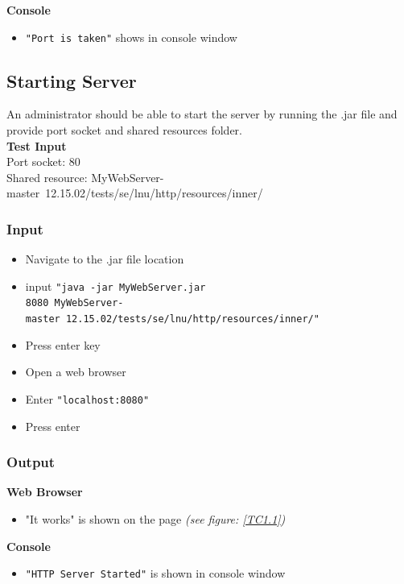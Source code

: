 \documentclass[a4paper, 12pt]{article}
\begin{document}
\textbf{Console}
\begin{itemize}
\item \texttt{"Port is taken"} shows in console window
\end{itemize}

\subsection{Starting Server}

An administrator should be able to start the server by running the .jar file and provide port socket and shared resources folder.\\
\textbf{Test Input} \\ Port socket: 80 \\ Shared resource: MyWebServer-master\ 12.15.02/tests/se/lnu/http/resources/inner/
\subsubsection{Input}
\begin{itemize}
\item Navigate to the .jar file location
\item input \texttt{"java -jar MyWebServer.jar \\
8080 MyWebServer-master\ 12.15.02/tests/se/lnu/http/resources/inner/"}
\item Press enter key
\item Open a web browser
\item Enter \texttt{"localhost:8080"}
\item Press enter
\end{itemize}

\subsubsection{Output}
\textbf{Web Browser}
\begin{itemize}
\item "It works" is shown on the page \textit{(see figure: \ref{TC1.1})}
\end{itemize}

\textbf{Console}
\begin{itemize}
\item \texttt{"HTTP Server Started"} is shown in console window
\end{itemize}
\end{document}
